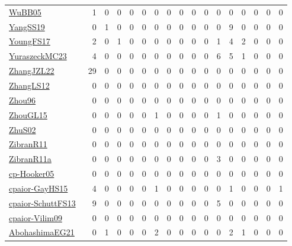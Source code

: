 {\begin{longtable}{l*{16}{r}}
\href{papers/WuBB05.pdf}{WuBB05}~\cite{WuBB05} & 1 & 0 & 0 & 0 & 0 & 0 & 0 & 0 & 0 & 0 & 0 & 0 & 0 & 0 & 0 & 0\\
\href{papers/YangSS19.pdf}{YangSS19}~\cite{YangSS19} & 0 & 1 & 0 & 0 & 0 & 0 & 0 & 0 & 0 & 0 & 0 & 9 & 0 & 0 & 0 & 0\\
\href{papers/YoungFS17.pdf}{YoungFS17}~\cite{YoungFS17} & 2 & 0 & 1 & 0 & 0 & 0 & 0 & 0 & 0 & 0 & 1 & 4 & 2 & 0 & 0 & 0\\
\href{papers/YuraszeckMC23.pdf}{YuraszeckMC23}~\cite{YuraszeckMC23} & 4 & 0 & 0 & 0 & 0 & 0 & 0 & 0 & 0 & 0 & 6 & 5 & 1 & 0 & 0 & 0\\
\href{papers/ZhangJZL22.pdf}{ZhangJZL22}~\cite{ZhangJZL22} & 29 & 0 & 0 & 0 & 0 & 0 & 0 & 0 & 0 & 0 & 0 & 0 & 0 & 0 & 0 & 0\\
\href{papers/ZhangLS12.pdf}{ZhangLS12}~\cite{ZhangLS12} & 0 & 0 & 0 & 0 & 0 & 0 & 0 & 0 & 0 & 0 & 0 & 0 & 0 & 0 & 0 & 0\\
\href{papers/Zhou96.pdf}{Zhou96}~\cite{Zhou96} & 0 & 0 & 0 & 0 & 0 & 0 & 0 & 0 & 0 & 0 & 0 & 0 & 0 & 0 & 0 & 0\\
\href{papers/ZhouGL15.pdf}{ZhouGL15}~\cite{ZhouGL15} & 0 & 0 & 0 & 0 & 0 & 1 & 0 & 0 & 0 & 0 & 1 & 0 & 0 & 0 & 0 & 0\\
\href{papers/ZhuS02.pdf}{ZhuS02}~\cite{ZhuS02} & 0 & 0 & 0 & 0 & 0 & 0 & 0 & 0 & 0 & 0 & 0 & 0 & 0 & 0 & 0 & 0\\
\href{papers/ZibranR11.pdf}{ZibranR11}~\cite{ZibranR11} & 0 & 0 & 0 & 0 & 0 & 0 & 0 & 0 & 0 & 0 & 0 & 0 & 0 & 0 & 0 & 0\\
\href{papers/ZibranR11a.pdf}{ZibranR11a}~\cite{ZibranR11a} & 0 & 0 & 0 & 0 & 0 & 0 & 0 & 0 & 0 & 0 & 3 & 0 & 0 & 0 & 0 & 0\\
\href{papers/cp-Hooker05.pdf}{cp-Hooker05}~\cite{cp-Hooker05} & 0 & 0 & 0 & 0 & 0 & 0 & 0 & 0 & 0 & 0 & 0 & 0 & 0 & 0 & 0 & 0\\
\href{papers/cpaior-GayHS15.pdf}{cpaior-GayHS15}~\cite{cpaior-GayHS15} & 4 & 0 & 0 & 0 & 0 & 1 & 0 & 0 & 0 & 0 & 0 & 1 & 0 & 0 & 0 & 1\\
\href{papers/cpaior-SchuttFS13.pdf}{cpaior-SchuttFS13}~\cite{cpaior-SchuttFS13} & 9 & 0 & 0 & 0 & 0 & 0 & 0 & 0 & 0 & 0 & 5 & 0 & 0 & 0 & 0 & 0\\
\href{papers/cpaior-Vilim09.pdf}{cpaior-Vilim09}~\cite{cpaior-Vilim09} & 0 & 0 & 0 & 0 & 0 & 0 & 0 & 0 & 0 & 0 & 0 & 0 & 0 & 0 & 0 & 0\\
\href{articles/AbohashimaEG21.pdf}{AbohashimaEG21}~\cite{AbohashimaEG21} & 0 & 1 & 0 & 0 & 0 & 2 & 0 & 0 & 0 & 0 & 0 & 2 & 1 & 0 & 0 & 0\\

\end{longtable}}
